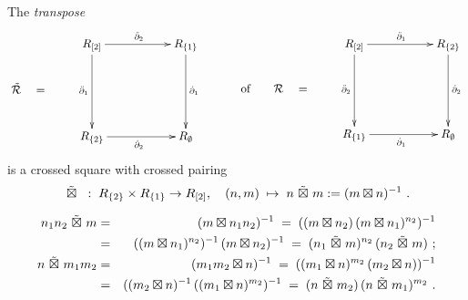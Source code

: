\begin{lem} \label{lam:Stranspose}
The \emph{transpose}
$$
\xymatrix{
  &  R_{[2]} \ar[rr]^{\ddbdyt} \ar[dd]_{\ddbdyo} 
     &&  R_{\{1\}} \ar[dd]^{\dbdyo} \\
\tilde{\calR} \quad = 
  &  &&                             \\
  &  R_{\{2\}} \ar[rr]_{\dbdyt} 
     && R_{\emptyset} 
}
\xymatrix{
  &&  R_{[2]} \ar[rr]^{\ddbdyo} \ar[dd]_{\ddbdyt} 
     &&  R_{\{2\}} \ar[dd]^{\dbdyt} \\
  & \mbox{of} \qquad \calR \quad =  
   & &&                             \\
  &&  R_{\{1\}} \ar[rr]_{\dbdyo} 
     &&  R_{\emptyset} 
}
$$
is a crossed square with crossed pairing
\begin{equation} \label{eq:btt}
\ \tilde{\boxtimes}\  \;:\; R_{\{2\}} \times R_{\{1\}} \to R_{[2]}, \quad 
(n,m) \;\mapsto\; n \ \tilde{\boxtimes}\  m := (m \boxtimes n)^{-1}~.
\end{equation}
\end{lem}
\begin{pf}
\begin{eqnarray*}
n_1n_2 \ \tilde{\boxtimes}\  m
  & = & (m \boxtimes n_1n_2)^{-1}
  \;=\; ((m \boxtimes n_2)\,(m \boxtimes n_1)^{n_2})^{-1} \\
  & = & ((m \boxtimes n_1)^{n_2})^{-1}\,(m \boxtimes n_2)^{-1}
  \;=\; (n_1 \ \tilde{\boxtimes}\  m)^{n_2}\,(n_2 \ \tilde{\boxtimes}\  m)~;\\
n \ \tilde{\boxtimes}\  m_1m_2
  & = & (m_1m_2 \boxtimes n)^{-1}
  \;=\; ((m_1 \boxtimes n)^{m_2}\,(m_2 \boxtimes n))^{-1} \\
  & = & ((m_2 \boxtimes n)^{-1}\,((m_1 \boxtimes n)^{m_2})^{-1}
  \;=\; (n \ \tilde{\boxtimes}\  m_2)\,(n \ \tilde{\boxtimes}\  m_1)^{m_2}~.
\end{eqnarray*}
\end{pf}

